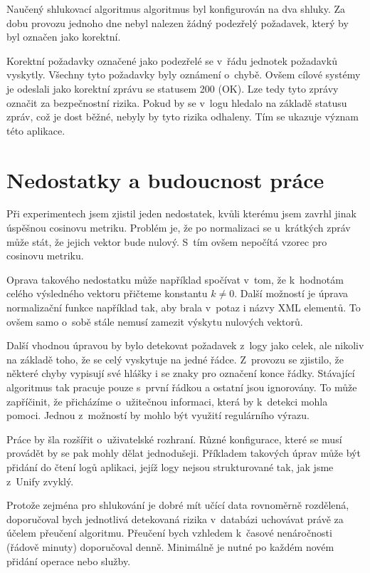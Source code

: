 \documentclass[thesis=M,czech]{FITthesis}[2012/10/20]
\begin{document}
			Naučený shlukovací algoritmus algoritmus byl konfigurován na dva shluky. Za dobu provozu jednoho dne nebyl nalezen žádný podezřelý požadavek, který by byl označen jako korektní.
			
			Korektní požadavky označené jako podezřelé se v~řádu jednotek požadavků vyskytly. Všechny tyto požadavky byly oznámení o~chybě. Ovšem cílové systémy je odeslali jako korektní zprávu se statusem 200 (OK). Lze tedy tyto zprávy označit za bezpečnostní rizika. Pokud by se v~logu hledalo na základě statusu zpráv, což je dost běžné, nebyly by tyto rizika odhaleny. Tím se ukazuje význam této aplikace.
		
		\section{Nedostatky a budoucnost práce}
			Při experimentech jsem zjistil jeden nedostatek, kvůli kterému jsem zavrhl jinak úspěšnou cosinovu metriku. Problém je, že po normalizaci se u~krátkých zpráv může stát, že jejich vektor bude nulový. S~tím ovšem nepočítá vzorec pro cosinovu metriku.
			
			Oprava takového nedostatku může například spočívat v~tom, že k~hodnotám celého výsledného vektoru přičteme konstantu $k \neq 0$. Další možností je úprava normalizační funkce například tak, aby brala v~potaz i názvy XML elementů. To ovšem samo o~sobě stále nemusí zamezit výskytu nulových vektorů.
			
			Další vhodnou úpravou by bylo detekovat požadavek z~logy jako celek, ale nikoliv na základě toho, že se celý vyskytuje na jedné řádce. Z~provozu se zjistilo, že některé chyby vypisují své hlášky i se znaky pro označení konce řádky. Stávající algoritmus tak pracuje pouze s~první řádkou a ostatní jsou ignorovány. To může zapříčinit, že přicházíme o~užitečnou informaci, která by k~detekci mohla pomoci. Jednou z~možností by mohlo být využití regulárního výrazu.
			
			Práce by šla rozšířit o~uživatelské rozhraní. Různé konfigurace, které se musí provádět by se pak mohly dělat jednodušeji. Příkladem takových úprav může být přidání do čtení logů aplikaci, jejíž logy nejsou strukturované tak, jak jsme z~Unify zvyklý. 
			
			Protože zejména pro shlukování je dobré mít učící data rovnoměrně rozdělená, doporučoval bych jednotlivá detekovaná rizika v~databázi uchovávat právě za účelem přeučení algoritmu. Přeučení bych vzhledem k~časové nenáročnosti (řádově minuty) doporučoval denně. Minimálně je nutné po každém novém přidání operace nebo služby.
	
\end{document}
